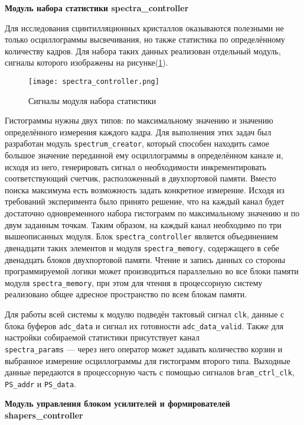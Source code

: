 \textbf{Модуль набора статистики spectra\_controller}\par
Для исследования сцинтилляционных кристаллов оказываются полезными не только осциллограммы высвечивания, но также статистика по определённому количеству кадров. Для набора таких данных реализован отдельный модуль, сигналы которого изображены на рисунке(\ref{fig:spectra_controller}).\par
\begin{figure}[ht]
    \centering
    \texttt{[image: spectra\_controller.png]}
    \caption{Сигналы модуля набора статистики}
    \label{fig:spectra_controller}
\end{figure}
Гистограммы нужны двух типов: по максимальному значению и значению определённого измерения каждого кадра. Для выполнения этих задач был разработан модуль \texttt{spectrum\_creator}, который способен находить самое большое значение переданной ему осциллограммы в определённом канале и, исходя из него, генерировать сигнал о необходимости инкрементировать соответствующий счетчик, расположенный в двухпортовой памяти. Вместо поиска максимума есть возможность задать конкретное измерение. Исходя из требований эксперимента было принято решение, что на каждый канал будет достаточно одновременного набора гистограмм по максимальному значению и по двум заданным точкам. Таким образом, на каждый канал необходимо по три вышеописанных модуля. Блок \texttt{spectra\_controller} является объединением двенадцати таких элементов и модуля \texttt{spectra\_memory}, содержащего в себе двенадцать блоков двухпортовой памяти. Чтение и запись данных со стороны программируемой логики может производиться параллельно во все блоки памяти модуля \texttt{spectra\_memory}, при этом для чтения в процессорную систему реализовано общее адресное пространство по всем блокам памяти.\par
Для работы всей системы к модулю подведён тактовый сигнал \texttt{clk}, данные с блока буферов \texttt{adc\_data} и сигнал их готовности \texttt{adc\_data\_valid}. Также для настройки собираемой статистики присутствует канал \\\texttt{spectra\_params} --- через него оператор может задавать количество корзин и выбранное измерение осциллограммы для гистограмм второго типа. Выходные данные передаются в процессорную часть с помощью сигналов \texttt{bram\_ctrl\_clk}, \texttt{PS\_addr} и \texttt{PS\_data}.\par
\textbf{Модуль управления блоком усилителей и формирователей shapers\_controller}\par

